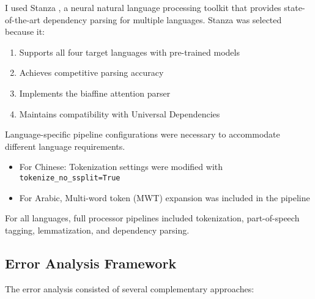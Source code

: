 \documentclass[11pt]{article}
\begin{document}
I used Stanza \citep{qi-etal-2020-stanza}, a neural natural language processing toolkit that provides state-of-the-art dependency parsing for multiple languages. Stanza was selected because it:
\begin{enumerate}
    \item Supports all four target languages with pre-trained models
    \item Achieves competitive parsing accuracy
    \item Implements the biaffine attention parser \citep{dozat-manning-2017-deep}
    \item Maintains compatibility with Universal Dependencies
\end{enumerate}

Language-specific pipeline configurations were necessary to accommodate different language requirements.
\begin{itemize}
    \item For Chinese: Tokenization settings were modified with \texttt{tokenize\_no\_ssplit=True}
    \item For Arabic, Multi-word token (MWT) expansion was included in the pipeline
\end{itemize}

For all languages, full processor pipelines included tokenization, part-of-speech tagging, lemmatization, and dependency parsing.

\subsection{Error Analysis Framework}

The error analysis consisted of several complementary approaches:
\end{document}
